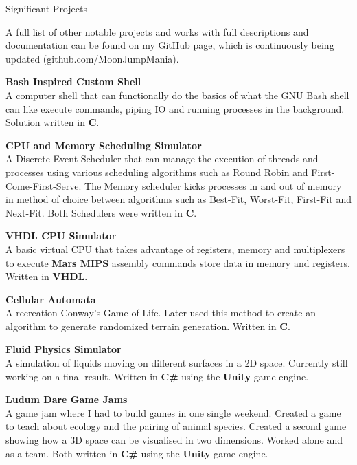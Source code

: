 \documentclass{resume}
\begin{document}
    \begin{rSection}{Significant Projects}

        A full list of other notable projects and works with full descriptions
        and documentation can be found on my GitHub page, which is continuously
        being updated (github.com/MoonJumpMania).

        \textbf{Bash Inspired Custom Shell}
        \\ A computer shell that can functionally do the basics of what the GNU
        Bash shell can like execute commands, piping IO and running processes in
        the background.
        Solution written in \textbf {C}.

        \textbf{CPU and Memory Scheduling Simulator}
        \\ A Discrete Event Scheduler that can manage the execution of threads
        and processes using various scheduling algorithms such as Round Robin and
        First-Come-First-Serve.
        The Memory scheduler kicks processes in and out of memory in method of
        choice between algorithms such as Best-Fit, Worst-Fit, First-Fit and
        Next-Fit.
        Both Schedulers were written in \textbf {C}.

        \textbf{VHDL CPU Simulator}
        \\ A basic virtual CPU that takes advantage of registers, memory and
        multiplexers to execute \textbf{Mars MIPS} assembly commands store data
        in memory and registers.
        Written in \textbf{VHDL}.

        \textbf{Cellular Automata}
        \\ A recreation Conway's Game of Life.
        Later used this method to create an algorithm to generate randomized
        terrain generation.
        Written in \textbf{C}.

        \textbf{Fluid Physics Simulator}
        \\ A simulation of liquids moving on different surfaces in a 2D space.
        Currently still working on a final result.
        Written in \textbf{C\#} using the \textbf{Unity} game engine.

        \textbf{Ludum Dare Game Jams}
        \\ A game jam where I had to build games in one single weekend.
        Created a game to teach about ecology and the pairing of animal species.
        Created a second game showing how a 3D space can be visualised in two
        dimensions.
        Worked alone and as a team.
        Both written in \textbf{C\#} using the \textbf{Unity} game engine.


\end{rSection}
\end{document}
